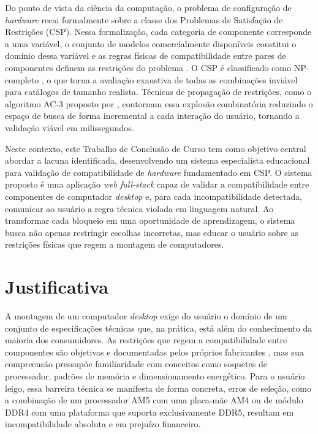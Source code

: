 Do ponto de vista da ciência da computação, o problema de configuração de \textit{hardware} recai formalmente
sobre a classe dos Problemas de Satisfação de Restrições (CSP). Nessa formalização, cada categoria de componente
corresponde a uma variável, o conjunto de modelos comercialmente disponíveis constitui o domínio dessa variável
e as regras físicas de compatibilidade entre pares de componentes definem as restrições do problema \cite{Russell2010}.
O CSP é classificado como NP-completo \cite{Sipser2012}, o que torna a avaliação exaustiva de todas as combinações
inviável para catálogos de tamanho realista. Técnicas de propagação de restrições, como o algoritmo AC-3 proposto
por \textcite{Mackworth1977}, contornam essa explosão combinatória reduzindo o espaço de busca de forma incremental
a cada interação do usuário, tornando a validação viável em milissegundos.

Neste contexto, este Trabalho de Conclusão de Curso tem como objetivo central abordar a lacuna identificada, desenvolvendo
um sistema especialista educacional para validação de compatibilidade de \textit{hardware} fundamentado em CSP.
O sistema proposto é uma aplicação \textit{web full-stack} capaz de validar a compatibilidade entre componentes de computador
\textit{desktop} e, para cada incompatibilidade detectada, comunicar ao usuário a regra técnica violada em
linguagem natural. Ao transformar cada bloqueio em uma oportunidade de aprendizagem, o sistema busca não apenas
restringir escolhas incorretas, mas educar o usuário sobre as restrições físicas que regem a montagem de computadores.

\section{Justificativa}
A montagem de um computador \textit{desktop} exige do usuário o domínio de um conjunto de especificações técnicas que, na prática,
está além do conhecimento da maioria dos consumidores. As restrições que regem a compatibilidade entre componentes são objetivas e
documentadas pelos próprios fabricantes \textcite{AMD2022,INTEL2023,JEDEC2020}, mas sua compreensão pressupõe familiaridade com
conceitos como soquetes de processador, padrões de memória e dimensionamento energético. Para o usuário leigo, essa barreira técnica
se manifesta de forma concreta, erros de seleção, como a combinação de um processador AM5 com uma placa-mãe AM4 ou de módulo DDR4 com
uma plataforma que suporta exclusivamente DDR5, resultam em incompatibilidade absoluta e em prejuízo financeiro.

